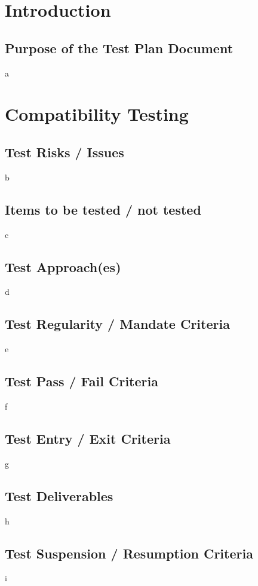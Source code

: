 \documentclass{article}
\begin{document}

\normalsize

\newpage
\tableofcontents

\newpage

\section{Introduction}
\subsection{Purpose of the Test Plan Document}
a

\section{Compatibility Testing}
\subsection{Test Risks / Issues}
b

\subsection{Items to be tested / not tested}
c

\subsection{Test Approach(es)}
d

\subsection{Test Regularity / Mandate Criteria}
e

\subsection{Test Pass / Fail Criteria}
f

\subsection{Test Entry / Exit Criteria}
g

\subsection{Test Deliverables}
h

\subsection{Test Suspension / Resumption Criteria}
i
\end{document}
